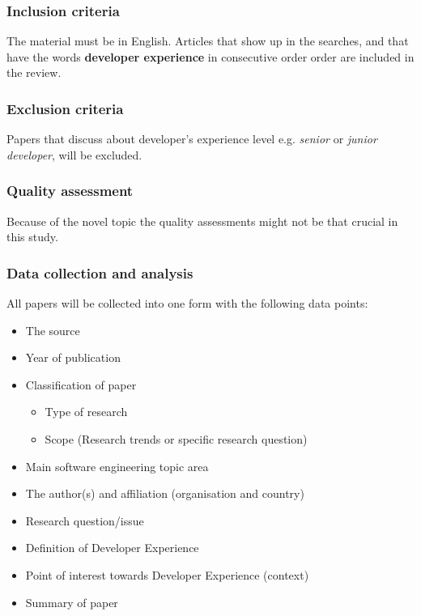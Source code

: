 \documentclass[english, 12pt, a4paper, sci, utf8, a-1b, online]{aaltothesis}
\begin{document}
\subsubsection{Inclusion criteria}

The material must be in English. Articles that show up in the searches, and that have the words \textbf{developer experience} in consecutive order order are included in the review.

\subsubsection{Exclusion criteria}

Papers that discuss about developer's experience level e.g. \textit{senior} or \textit{junior developer}, will be excluded.


\subsubsection{Quality assessment}

Because of the novel topic the quality assessments might not be that crucial in this study.

\subsubsection{Data collection and analysis}

All papers will be collected into one form with the following data points:

\begin{itemize}
  \item The source
  \item Year of publication
  \item Classification of paper
        \begin{itemize}
          \item Type of research
          \item Scope (Research trends or specific research question)
        \end{itemize}
  \item Main software engineering topic area
  \item The author(s) and affiliation (organisation and country)
  \item Research question/issue
  \item Definition of Developer Experience
  \item Point of interest towards Developer Experience (context)
  \item Summary of paper
\end{itemize}
\end{document}
